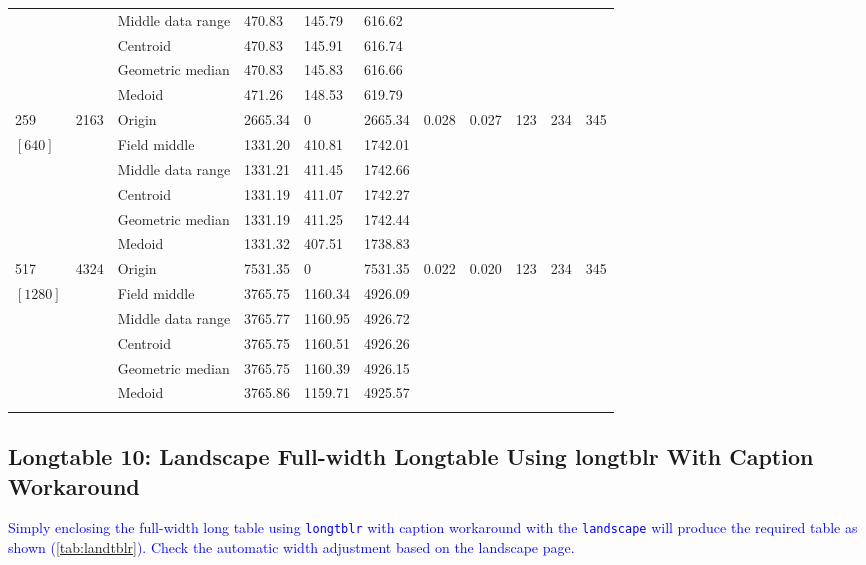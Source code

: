 \documentclass[phd]{ndsu-thesis-2022}
\newcommand\italk[1]{\textcolor{blue}{#1}}  %
\begin{document}
\begin{landscape}
{{\begin{ThreePartTable}
\begin{longtable}{lll lll ll rrr}
 &  & Middle data range  & 470.83 & 145.79 & 616.62 \\
 &  & Centroid & 470.83 & 145.91 & 616.74 \\
 &  & Geometric median & 470.83 & 145.83 & 616.66 \\
 &  & Medoid  & 471.26 & 148.53 & 619.79 \\
\midrule
259 & 2163 & Origin  & 2665.34 & 0 & 2665.34 & 0.028 & 0.027 & 123 & 234 & 345 \\
$[640]$ &  & Field middle  & 1331.20 & 410.81 & 1742.01 \\
 &  & Middle data range  & 1331.21 & 411.45 & 1742.66 \\
 &  & Centroid & 1331.19 & 411.07 & 1742.27 \\
 &  & Geometric median & 1331.19 & 411.25 & 1742.44 \\
 &  & Medoid  & 1331.32 & 407.51 & 1738.83 \\
\midrule
517 & 4324 & Origin  & 7531.35 & 0 & 7531.35 & 0.022 & 0.020 & 123 & 234 & 345 \\
$[1280]$ &  & Field middle  & 3765.75 & 1160.34 & 4926.09 \\
 &  & Middle data range  & 3765.77 & 1160.95 & 4926.72 \\
 &  & Centroid & 3765.75 & 1160.51 & 4926.26 \\
 &  & Geometric median & 3765.75 & 1160.39 & 4926.15 \\
 &  & Medoid  & 3765.86 & 1159.71 & 4925.57 \\
\label{longtabls} %
\end{longtable} 
\end{ThreePartTable}
}
}
\end{landscape}

\setlength{\parindent}{0.5in}
\vspace{-2ex}



\subsection{Longtable 10: Landscape Full-width Longtable Using longtblr With Caption Workaround}

\italk{Simply enclosing the full-width long table using \texttt{longtblr} with caption workaround with the \texttt{landscape} will produce the required table as shown (\cref{tab:landtblr}). Check the automatic width adjustment based on the landscape page. 
}
\end{document}
